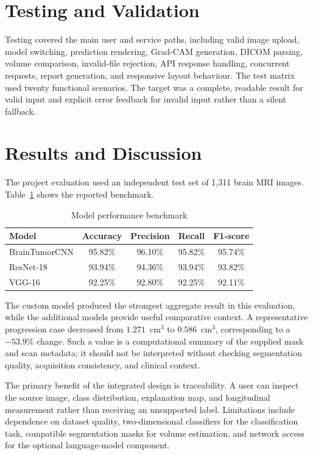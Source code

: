 \documentclass[conference]{IEEEtran}
\begin{document}
\section{Testing and Validation}
Testing covered the main user and service paths, including valid image upload, model switching, prediction rendering, Grad-CAM generation, DICOM parsing, volume comparison, invalid-file rejection, API response handling, concurrent requests, report generation, and responsive layout behaviour. The test matrix used twenty functional scenarios. The target was a complete, readable result for valid input and explicit error feedback for invalid input rather than a silent fallback.

\section{Results and Discussion}
The project evaluation used an independent test set of 1,311 brain MRI images. Table~\ref{tab:results} shows the reported benchmark.

\begin{table}[t]
\centering
\caption{Model performance benchmark}
\label{tab:results}
\begin{tabular}{lcccc}
\toprule
Model & Accuracy & Precision & Recall & F1-score\\
\midrule
BrainTumorCNN & 95.82\% & 96.10\% & 95.82\% & 95.74\%\\
ResNet-18 & 93.94\% & 94.36\% & 93.94\% & 93.82\%\\
VGG-16 & 92.25\% & 92.80\% & 92.25\% & 92.11\%\\
\bottomrule
\end{tabular}
\end{table}

The custom model produced the strongest aggregate result in this evaluation, while the additional models provide useful comparative context. A representative progression case decreased from $1.271$~cm$^3$ to $0.586$~cm$^3$, corresponding to a $-53.9\%$ change. Such a value is a computational summary of the supplied mask and scan metadata; it should not be interpreted without checking segmentation quality, acquisition consistency, and clinical context.

The primary benefit of the integrated design is traceability. A user can inspect the source image, class distribution, explanation map, and longitudinal measurement rather than receiving an unsupported label. Limitations include dependence on dataset quality, two-dimensional classifiers for the classification task, compatible segmentation masks for volume estimation, and network access for the optional language-model component.
\end{document}
